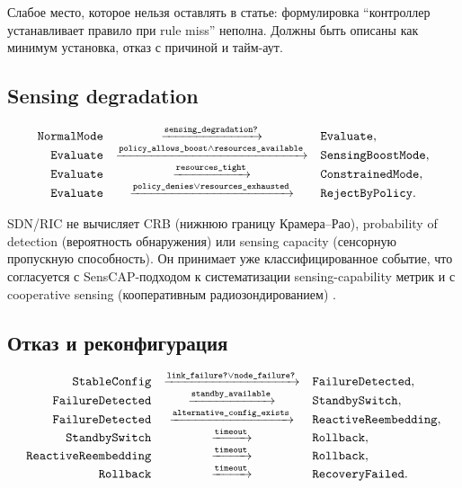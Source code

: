 \documentclass[10pt,a4paper]{article}
\newcommand{\code}[1]{\ifmmode\text{\ttfamily\detokenize{#1}}\else\texttt{\detokenize{#1}}\fi}
\begin{document}
Слабое место, которое нельзя оставлять в статье: формулировка ``контроллер устанавливает правило при rule miss'' неполна. Должны быть описаны как минимум установка, отказ с причиной и тайм-аут.

\subsection{Sensing degradation}

\[
\begin{array}{rcl}
\code{NormalMode} & \xrightarrow{\code{sensing_degradation?}} & \code{Evaluate},\\
\code{Evaluate} & \xrightarrow{\code{policy_allows_boost}\land \code{resources_available}} & \code{SensingBoostMode},\\
\code{Evaluate} & \xrightarrow{\code{resources_tight}} & \code{ConstrainedMode},\\
\code{Evaluate} & \xrightarrow{\code{policy_denies}\vee \code{resources_exhausted}} & \code{RejectByPolicy}.
\end{array}
\]

SDN/RIC не вычисляет CRB (нижнюю границу Крамера--Рао), probability of detection (вероятность обнаружения) или sensing capacity (сенсорную пропускную способность). Он принимает уже классифицированное событие, что согласуется с SensCAP-подходом к систематизации sensing-capability метрик \cite{liu_senscap} и с cooperative sensing (кооперативным радиозондированием) \cite{liu_coop}.

\subsection{Отказ и реконфигурация}

\[
\begin{array}{rcl}
\code{StableConfig} & \xrightarrow{\code{link_failure?}\vee \code{node_failure?}} & \code{FailureDetected},\\
\code{FailureDetected} & \xrightarrow{\code{standby_available}} & \code{StandbySwitch},\\
\code{FailureDetected} & \xrightarrow{\code{alternative_config_exists}} & \code{ReactiveReembedding},\\
\code{StandbySwitch} & \xrightarrow{\code{timeout}} & \code{Rollback},\\
\code{ReactiveReembedding} & \xrightarrow{\code{timeout}} & \code{Rollback},\\
\code{Rollback} & \xrightarrow{\code{timeout}} & \code{RecoveryFailed}.
\end{array}
\]
\end{document}
